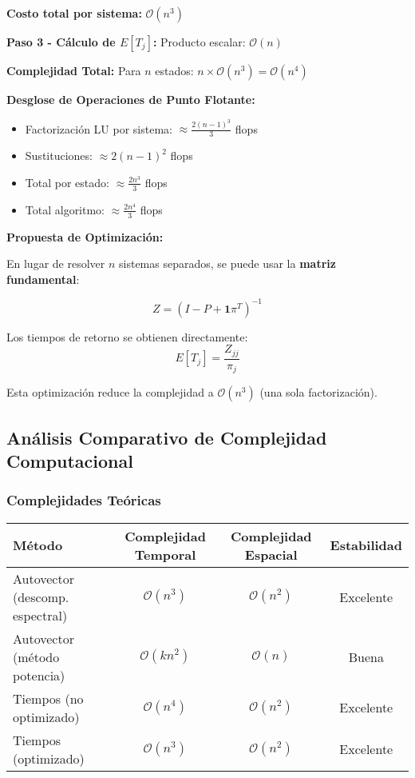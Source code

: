 \textbf{Costo total por sistema:} $\mathcal{O}(n^3)$

\textbf{Paso 3 - Cálculo de $E[T_j]$:}
Producto escalar: $\mathcal{O}(n)$

\textbf{Complejidad Total:}
Para $n$ estados: $n \times \mathcal{O}(n^3) = \mathcal{O}(n^4)$

\textbf{Desglose de Operaciones de Punto Flotante:}
\begin{itemize}
\item Factorización LU por sistema: $\approx \frac{2(n-1)^3}{3}$ flops
\item Sustituciones: $\approx 2(n-1)^2$ flops
\item Total por estado: $\approx \frac{2n^3}{3}$ flops
\item Total algoritmo: $\approx \frac{2n^4}{3}$ flops
\end{itemize}

\textbf{Propuesta de Optimización:}

En lugar de resolver $n$ sistemas separados, se puede usar la \textbf{matriz fundamental}:

\begin{equation}
Z = (I - P + \mathbf{1}\pi^T)^{-1}
\end{equation}

Los tiempos de retorno se obtienen directamente:
\begin{equation}
E[T_j] = \frac{Z_{jj}}{\pi_j}
\end{equation}

Esta optimización reduce la complejidad a $\mathcal{O}(n^3)$ (una sola factorización).

\subsection{Análisis Comparativo de Complejidad Computacional}

\subsubsection{Complejidades Teóricas}

\begin{table}[h]
\centering
\begin{tabular}{|l|c|c|c|}
\hline
\textbf{Método} & \textbf{Complejidad Temporal} & \textbf{Complejidad Espacial} & \textbf{Estabilidad} \\
\hline
Autovector (descomp. espectral) & $\mathcal{O}(n^3)$ & $\mathcal{O}(n^2)$ & Excelente \\
Autovector (método potencia) & $\mathcal{O}(kn^2)$ & $\mathcal{O}(n)$ & Buena \\
Tiempos (no optimizado) & $\mathcal{O}(n^4)$ & $\mathcal{O}(n^2)$ & Excelente \\
Tiempos (optimizado) & $\mathcal{O}(n^3)$ & $\mathcal{O}(n^2)$ & Excelente \\
\hline
\end{tabular}
\end{table}

